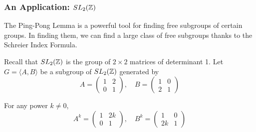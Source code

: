 \subsubsection{An Application: $SL_2(\mathbb{Z})$}

The Ping-Pong Lemma is a powerful tool for finding free subgroups of certain groups. In finding them, we can find a large class of free subgroups thanks to the Schreier Index Formula.

Recall that $SL_2(\mathbb{Z})$ is the group of $2 \times 2$ matrices of determinant 1. Let $G = \langle A, B \rangle$ be a subgroup of $SL_2(\mathbb{Z})$ generated by 
\[A = \begin{pmatrix}
    1 & 2 \\ 0 & 1
\end{pmatrix}, \quad B = \begin{pmatrix}
    1 & 0 \\ 2 & 1
\end{pmatrix}\]

\begin{lemma}\label{SL2Z Matrix Powers}
    For any power $k \neq 0$,
    \[A^k = \begin{pmatrix}
        1 & 2k \\ 0 & 1
    \end{pmatrix}, \quad B^k = \begin{pmatrix}
        1 & 0 \\ 2k & 1
    \end{pmatrix}\]
\end{lemma}

